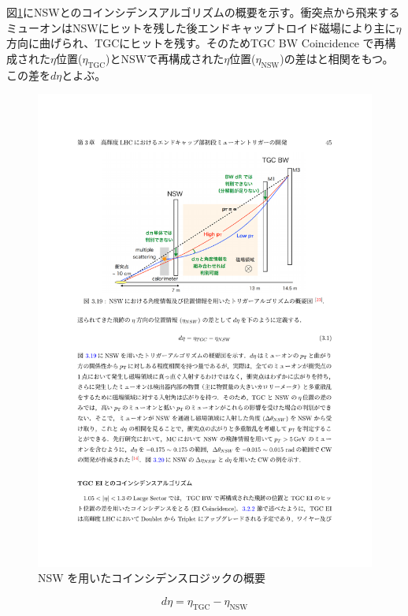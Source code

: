 図\ref{Concept_NSW}にNSWとのコインシデンスアルゴリズムの概要を示す。衝突点から飛来するミューオンはNSWにヒットを残した後エンドキャップトロイド磁場により主に$\eta$方向に曲げられ、TGCにヒットを残す。そのためTGC BW Coincidence で再構成された$\eta$位置($\eta_{\mathrm{TGC}}$)とNSWで再構成された$\eta$位置($\eta_{\mathrm{NSW}}$)の差は\pt と相関をもつ。この差を$d\eta$とよぶ。

\begin{figure} 
\centering
\includegraphics[width=16cm]{fig/SL/Concept_NSW.pdf}
\caption[NSW を用いたコインシデンスロジックの概要]{NSW を用いたコインシデンスロジックの概要\cite{mt_akatsuka}}
\label{Concept_NSW}
\end{figure}

\begin{equation}
    d\eta = \eta_{\mathrm{TGC}} - \eta_{\mathrm{NSW}}
    \label{eq:deta}
\end{equation}

